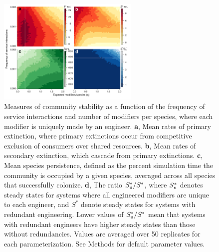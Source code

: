 \documentclass[twocolumn,preprintnumbers,amsmath,amssymb,superscriptaddress,linenumbers]{revtex4-1}
\begin{document}
\begin{figure}[h!]
\centering
\includegraphics[width=0.6\textwidth]{fig_engineers5_unique.pdf}
\caption{
Measures of community stability as a function of the frequency of service interactions and number of modifiers per species, where each modifier is uniquely made by an engineer.
\textbf{a}, Mean rates of primary extinction, where primary extinctions occur from competitive exclusion of consumers over shared resources.
\textbf{b}, Mean rates of secondary extinction, which cascade from primary extinctions.
\textbf{c}, Mean species persistence, defined as the percent simulation time the community is occupied by a given species, averaged across all species that successfully colonize.
\textbf{d}, The ratio $S^*_{\rm u}/S^*$, where $S^*_{\rm u}$ denotes steady states for systems where all engineered modifiers are unique to each engineer, and $S^*$ denote steady states for systems with redundant engineering. Lower values of $S^*_{\rm u}/S^*$ mean that systems with redundant engineers have higher steady states than those without redundancies.
Values are averaged over 50 replicates for each parameterization.
See Methods for default parameter values.
}
\label{fig:unique}
\end{figure}
\end{document}
